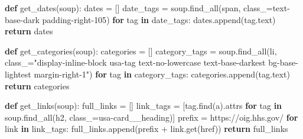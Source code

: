 \documentclass[
  letterpaper,
  DIV=11,
  numbers=noendperiod]{scrartcl}
\newenvironment{Shaded}{\begin{snugshade}}{\end{snugshade}}
\newcommand{\ControlFlowTok}[1]{\textcolor[rgb]{0.00,0.23,0.31}{\textbf{#1}}}
\newcommand{\KeywordTok}[1]{\textcolor[rgb]{0.00,0.23,0.31}{\textbf{#1}}}
\newcommand{\NormalTok}[1]{\textcolor[rgb]{0.00,0.23,0.31}{#1}}
\newcommand{\OperatorTok}[1]{\textcolor[rgb]{0.37,0.37,0.37}{#1}}
\newcommand{\StringTok}[1]{\textcolor[rgb]{0.13,0.47,0.30}{#1}}
\begin{document}
\begin{Shaded}
\begin{Highlighting}[]
\KeywordTok{def}\NormalTok{ get\_dates(soup):}
\NormalTok{    dates }\OperatorTok{=}\NormalTok{ []}
\NormalTok{    date\_tags }\OperatorTok{=}\NormalTok{ soup.find\_all(}\StringTok{\textquotesingle{}span\textquotesingle{}}\NormalTok{, class\_}\OperatorTok{=}\StringTok{\textquotesingle{}text{-}base{-}dark padding{-}right{-}105\textquotesingle{}}\NormalTok{)}
    \ControlFlowTok{for}\NormalTok{ tag }\KeywordTok{in}\NormalTok{ date\_tags:}
\NormalTok{        dates.append(tag.text)}
    \ControlFlowTok{return}\NormalTok{ dates}
\end{Highlighting}
\end{Shaded}

\begin{Shaded}
\begin{Highlighting}[]
\KeywordTok{def}\NormalTok{ get\_categories(soup):}
\NormalTok{    categories }\OperatorTok{=}\NormalTok{ []}
\NormalTok{    category\_tags }\OperatorTok{=}\NormalTok{ soup.find\_all(}\StringTok{\textquotesingle{}li\textquotesingle{}}\NormalTok{, class\_}\OperatorTok{=}\StringTok{"display{-}inline{-}block usa{-}tag text{-}no{-}lowercase text{-}base{-}darkest bg{-}base{-}lightest margin{-}right{-}1"}\NormalTok{)}
    \ControlFlowTok{for}\NormalTok{ tag }\KeywordTok{in}\NormalTok{ category\_tags:}
\NormalTok{        categories.append(tag.text)}
    \ControlFlowTok{return}\NormalTok{ categories}
\end{Highlighting}
\end{Shaded}

\begin{Shaded}
\begin{Highlighting}[]
\KeywordTok{def}\NormalTok{ get\_links(soup):}
\NormalTok{    full\_links }\OperatorTok{=}\NormalTok{ []}
\NormalTok{    link\_tags }\OperatorTok{=}\NormalTok{ [tag.find(}\StringTok{\textquotesingle{}a\textquotesingle{}}\NormalTok{).attrs }\ControlFlowTok{for}\NormalTok{ tag }\KeywordTok{in}\NormalTok{ soup.find\_all(}\StringTok{\textquotesingle{}h2\textquotesingle{}}\NormalTok{, class\_}\OperatorTok{=}\StringTok{\textquotesingle{}usa{-}card\_\_heading\textquotesingle{}}\NormalTok{)]}
\NormalTok{    prefix }\OperatorTok{=} \StringTok{\textquotesingle{}https://oig.hhs.gov/\textquotesingle{}}
    \ControlFlowTok{for}\NormalTok{ link }\KeywordTok{in}\NormalTok{ link\_tags:}
\NormalTok{        full\_links.append(prefix }\OperatorTok{+}\NormalTok{ link.get(}\StringTok{\textquotesingle{}href\textquotesingle{}}\NormalTok{))}
    \ControlFlowTok{return}\NormalTok{ full\_links}
\end{Highlighting}
\end{Shaded}
\end{document}
